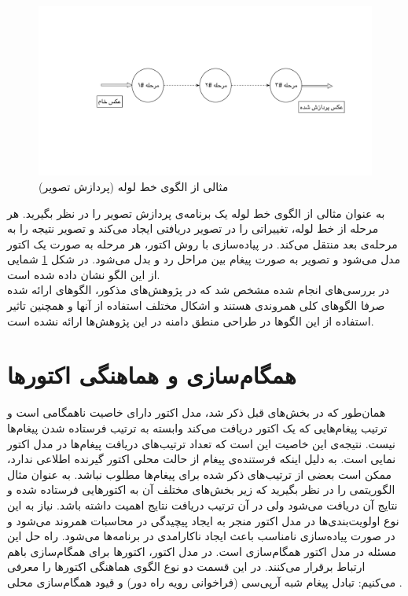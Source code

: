 \begin{figure}
    \begin{center}
	\includegraphics[width=16cm]{3-RelatedWork/Figures/pipeline.pdf}
    \end{center}
    \caption{\label{fig:pipeline}  مثالی از الگوی خط لوله (پردازش تصویر) }
\end{figure}
به عنوان مثالی از الگوی خط لوله یک برنامه‌ی پردازش تصویر را در نظر بگیرید. هر مرحله از خط لوله، تغییراتی را در تصویر دریافتی ایجاد می‌کند و تصویر نتیجه را به مرحله‌ی بعد منتقل می‌کند. در پیاده‌سازی با روش اکتور، هر مرحله به صورت یک اکتور مدل می‌شود و تصویر به صورت پیغام بین مراحل رد و بدل می‌شود. در شکل \ref{fig:pipeline} شمایی از این الگو نشان داده شده‌ است. \\
در بررسی‌های انجام شده مشخص شد که در پژوهش‌های مذکور، الگوهای ارائه شده صرفا الگوهای کلی همروندی هستند و اشکال مختلف استفاده از آنها و همچنین تاثیر استفاده از این الگوها در طراحی منطق دامنه در این پژوهش‌ها ارائه نشده است.

\section{ همگام‌سازی و هماهنگی اکتورها }
\label{section:coordinationAndSyncronization}
همان‌طور که در بخش‌های قبل ذکر شد،  مدل اکتور دارای خاصیت ناهمگامی‌ است و ترتیب پیغام‌هایی که یک اکتور دریافت می‌کند وابسته به ترتیب فرستاده شدن پیغام‌ها نیست. نتیجه‌ی این خاصیت این است که تعداد ترتیب‌های دریافت پیغام‌ها در مدل اکتور نمایی است\cite{KarmaniAgha_Actors_11}. به دلیل اینکه فرستنده‌ی پیغام از حالت محلی اکتور گیرنده اطلاعی ندارد، ممکن است بعضی از ترتیب‌های ذکر شده برای پیغام‌ها مطلوب نباشد. به عنوان مثال الگوریتمی را در نظر بگیرید که زیر بخش‌های مختلف آن به اکتور‌هایی فرستاده شده و نتایج آن دریافت می‌شود ولی در آن ترتیب دریافت نتایج اهمیت داشته باشد.  نیاز به این نوع اولویت‌بندی‌ها در مدل اکتور منجر به ایجاد پیچیدگی در محاسبات همروند می‌شود و در صورت پیاده‌سازی نامناسب باعث ایجاد ناکارامدی در برنامه‌ها می‌شود. راه حل این مسئله در مدل اکتور همگام‌سازی است. در مدل اکتور، اکتور‌ها برای همگام‌سازی باهم ارتباط برقرار می‌کنند. در این قسمت دو نوع الگوی هماهنگی اکتور‌ها را معرفی می‌کنیم: تبادل پیغام شبه آرپی‌سی (فراخوانی رویه راه دور) و قیود همگام‌سازی محلی  \cite{Agha1990,Agha93abstractionand,Papaioannou,KarmaniAgha_Actors_11}.
